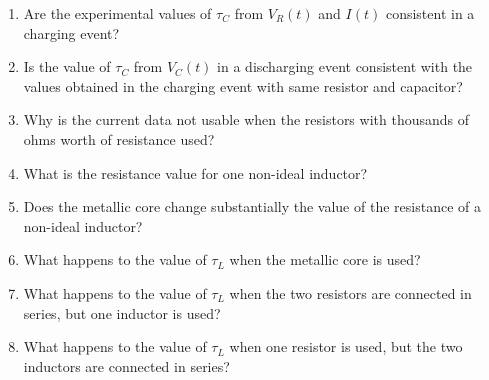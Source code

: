 \begin{enumerate}
    \item Are the experimental values of $\tau_{C}$ from $V_{R}(t)$ and $I(t)$ consistent in a charging event?
    \item Is the value of $\tau_{C}$ from $V_{C}(t)$ in a discharging event consistent with the values obtained in the charging event with same resistor and capacitor?
    \item Why is the current data not usable when the resistors with thousands of ohms worth of resistance used?
    \item What is the resistance value for one non-ideal inductor?
    \item Does the metallic core change substantially the value of the resistance of a non-ideal inductor?
    \item What happens to the value of $\tau_{L}$ when the metallic core is used?
    \item What happens to the value of $\tau_{L}$ when the two resistors are connected in series, but one inductor is used?
    \item What happens to the value of $\tau_{L}$ when one resistor is used, but the two inductors are connected in series?
\end{enumerate}
\newpage
